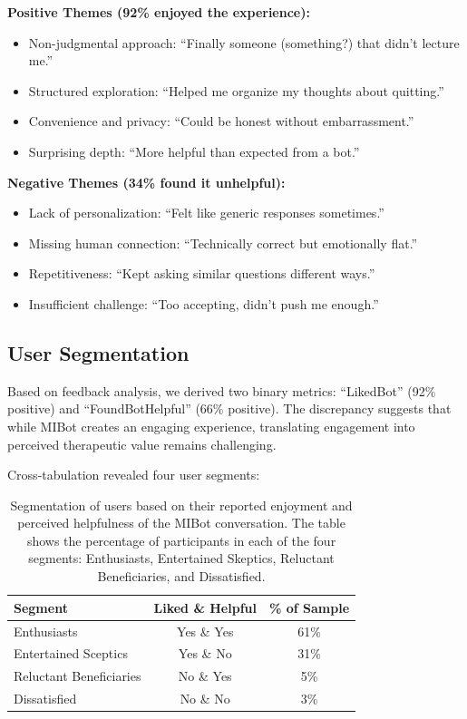 \textbf{Positive Themes (92\% enjoyed the experience):}
\begin{itemize}
\item Non-judgmental approach: ``Finally someone (something?) that didn't lecture me.''
\item Structured exploration: ``Helped me organize my thoughts about quitting.''
\item Convenience and privacy: ``Could be honest without embarrassment.''
\item Surprising depth: ``More helpful than expected from a bot.''
\end{itemize}

\textbf{Negative Themes (34\% found it unhelpful):}
\begin{itemize}
\item Lack of personalization: ``Felt like generic responses sometimes.''
\item Missing human connection: ``Technically correct but emotionally flat.''
\item Repetitiveness: ``Kept asking similar questions different ways.''
\item Insufficient challenge: ``Too accepting, didn't push me enough.''
\end{itemize}

\subsection*{User Segmentation}

Based on feedback analysis, we derived two binary metrics: ``LikedBot'' (92\% positive) and ``FoundBotHelpful'' (66\% positive). The discrepancy suggests that while MIBot creates an engaging experience, translating engagement into perceived therapeutic value remains challenging.

Cross-tabulation revealed four user segments:

\begin{table}[ht]
  \centering
  \small
  \setlength{\tabcolsep}{4pt}
  \renewcommand{\arraystretch}{1.1}
  \begin{tabular}{@{}lcc@{}}
    \toprule
    \textbf{Segment} & \textbf{Liked \& Helpful} & \textbf{\% of Sample} \\
    \midrule
    Enthusiasts & Yes \& Yes & 61\% \\
    Entertained Sceptics & Yes \& No & 31\% \\
    Reluctant Beneficiaries & No \& Yes & 5\% \\
    Dissatisfied & No \& No & 3\% \\
    \bottomrule
  \end{tabular}
  \caption[Segmentation of MIBot Participants based on their Experiences]{Segmentation of users based on their reported enjoyment and perceived helpfulness of the MIBot conversation. The table shows the percentage of participants in each of the four segments: Enthusiasts, Entertained Skeptics, Reluctant Beneficiaries, and Dissatisfied.}
  \label{table:user_segments}
\end{table}


